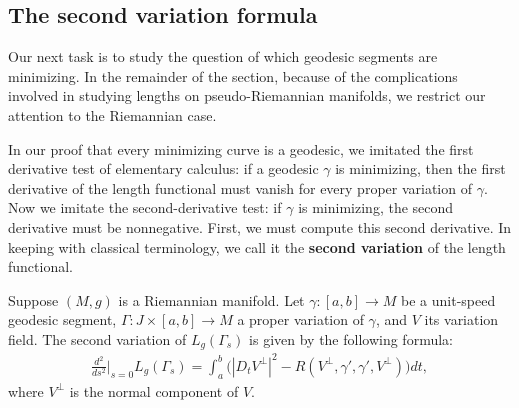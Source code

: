 \subsection{The second variation formula}
Our next task is to study the question of which geodesic segments are minimizing. In the remainder of the section, because of the complications involved in studying 
lengths on pseudo-Riemannian manifolds, we restrict our attention to the Riemannian case.\par
In our proof that every minimizing curve is a geodesic, we imitated the first derivative test of elementary calculus: if a geodesic $\gamma$ is minimizing, then the 
first derivative of the length functional must vanish for every proper variation of $\gamma$. Now we imitate the second-derivative test: if $\gamma$ is minimizing, the 
second derivative must be nonnegative. First, we must compute this second derivative. In keeping with classical terminology, we call it the \textbf{second variation} 
of the length functional.
\begin{theorem}
Suppose $(M,g)$ is a Riemannian manifold. Let $\gamma:[a,b]\to M$ be a unit-speed geodesic segment, $\Gamma:J\times[a,b]\to M$ a proper variation of $\gamma$, and $V$ 
its variation field. The second variation of $L_g(\Gamma_s)$ is given by the following formula:
\begin{align}\label{Riemann second variation}
\frac{d^2}{d s^2}\Big|_{s=0}L_g(\Gamma_s)=\int_a^b\Big(|D_tV^{\bot}|^2-R(V^\bot,\gamma',\gamma',V^\bot)\Big)dt,
\end{align}
where $V^{\bot}$ is the normal component of $V$.
\end{theorem}
